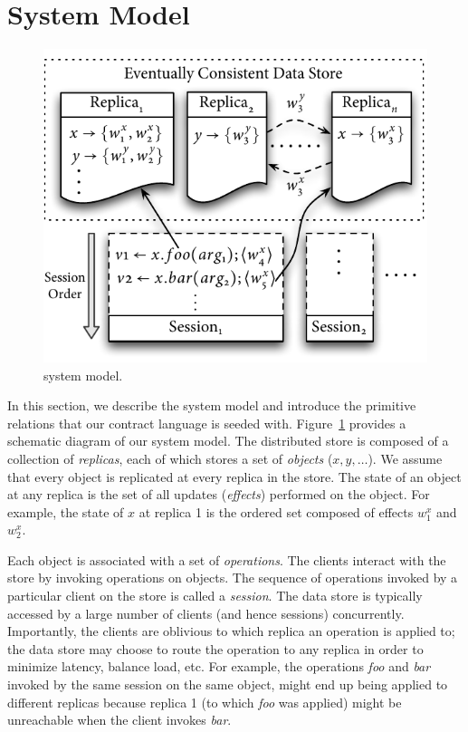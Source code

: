 \section{System Model}
\label{sec:sysmod}

\begin{figure}
\centering
\includegraphics[width=0.7\columnwidth]{Figures/SystemModel}
\caption{\name system model.}
\label{fig:sysmod}
\end{figure}

In this section, we describe the system model and introduce the primitive
relations that our contract language is seeded with. Figure~\ref{fig:sysmod}
provides a schematic diagram of our system model. The distributed store is
composed of a collection of \emph{replicas}, each of which stores a set of
\emph{objects} ($x,y,\ldots$). We assume that every object is replicated at
every replica in the store. The state of an object at any replica is the set of
all updates (\emph{effects}) performed on the object. For example, the state of
$x$ at replica 1 is the ordered set composed of effects $w^x_1$ and $w^x_2$.

Each object is associated with a set of \emph{operations}. The clients interact
with the store by invoking operations on objects. The sequence of operations
invoked by a particular client on the store is called a \emph{session}. The
data store is typically accessed by a large number of clients (and hence
sessions) concurrently. Importantly, the clients are oblivious to which replica
an operation is applied to; the data store may choose to route the operation to
any replica in order to minimize latency, balance load, etc. For example, the
operations \emph{foo} and \emph{bar} invoked by the same session on the same
object, might end up being applied to different replicas because replica 1 (to
which \emph{foo} was applied) might be unreachable when the client invokes
\emph{bar}.

